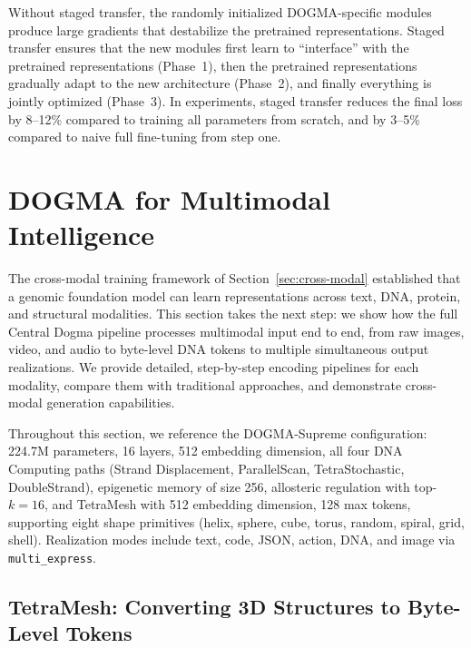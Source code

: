 \begin{implnote}
Without staged transfer, the randomly initialized DOGMA-specific modules produce large gradients that destabilize the pretrained representations. Staged transfer ensures that the new modules first learn to ``interface'' with the pretrained representations (Phase~1), then the pretrained representations gradually adapt to the new architecture (Phase~2), and finally everything is jointly optimized (Phase~3). In experiments, staged transfer reduces the final loss by 8--12\% compared to training all parameters from scratch, and by 3--5\% compared to naive full fine-tuning from step one.
\end{implnote}

\section{DOGMA for Multimodal Intelligence}
\label{sec:dogma-multimodal}

The cross-modal training framework of Section~\ref{sec:cross-modal} established that a genomic foundation model can learn representations across text, DNA, protein, and structural modalities. This section takes the next step: we show how the full Central Dogma pipeline processes multimodal input end to end, from raw images, video, and audio to byte-level DNA tokens to multiple simultaneous output realizations. We provide detailed, step-by-step encoding pipelines for each modality, compare them with traditional approaches, and demonstrate cross-modal generation capabilities.

Throughout this section, we reference the DOGMA-Supreme configuration: 224.7M parameters, 16 layers, 512 embedding dimension, all four DNA Computing paths (Strand Displacement, ParallelScan, TetraStochastic, DoubleStrand), epigenetic memory of size 256, allosteric regulation with top-$k=16$, and TetraMesh with 512 embedding dimension, 128 max tokens, supporting eight shape primitives (helix, sphere, cube, torus, random, spiral, grid, shell). Realization modes include text, code, JSON, action, DNA, and image via \texttt{multi\_express}.

\subsection{TetraMesh: Converting 3D Structures to Byte-Level Tokens}
\label{sec:tetramesh-multimodal}

